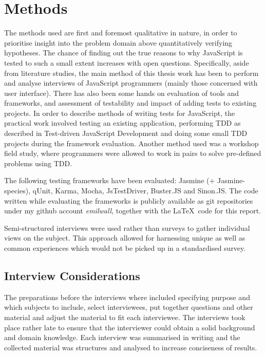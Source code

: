 \documentclass[11pt]{article}
\begin{document}
\section{Methods}

The methods used are first and foremost qualitative in nature, in order to prioritise insight into the problem domain above quantitatively verifying hypotheses. The chance of finding out the true reasons to why JavaScript is tested to such a small extent increases with open questions. Specifically, aside from literature studies, the main method of this thesis work has been to perform and analyse interviews of JavaScript programmers (mainly those concerned with user interface). There has also been some hands on evaluation of tools and frameworks, and assessment of testability and impact of adding tests to existing projects. In order to describe methods of writing tests for JavaScript, the practical work involved testing an existing application, performing TDD as described in Test-driven JavaScript Development\cite{Tddjs} and doing some small TDD projects during the framework evaluation. Another method used was a workshop field study, where programmers were allowed to work in pairs to solve pre-defined problems using TDD.

The following testing frameworks have been evaluated: Jasmine\cite{JasmineSite} (+ Jasmine-species\cite{JasmineSpecies}), qUnit\cite{QUnitSite}, Karma\cite{KarmaSite}, Mocha\cite{MochaSite}, JsTestDriver\cite{JsTestDriver}, Buster.JS\cite{BusterJS} and Sinon.JS\cite{SinonJS}. The code written while evaluating the frameworks is publicly available as git repositories under my github account \emph{emilwall}, together with the \LaTeX~code for this report.

Semi-structured interviews were used rather than surveys to gather individual views on the subject. This approach allowed for harnessing unique as well as common experiences which would not be picked up in a standardised survey.

\subsection{Interview Considerations}

The preparations before the interviews where included specifying purpose and which subjects to include, select interviewees, put together questions and other material and adjust the material to fit each interviewee. The interviews took place rather late to ensure that the interviewer could obtain a solid background and domain knowledge. Each interview was summarised in writing and the collected material was structures and analysed to increase conciseness of results.
\end{document}
